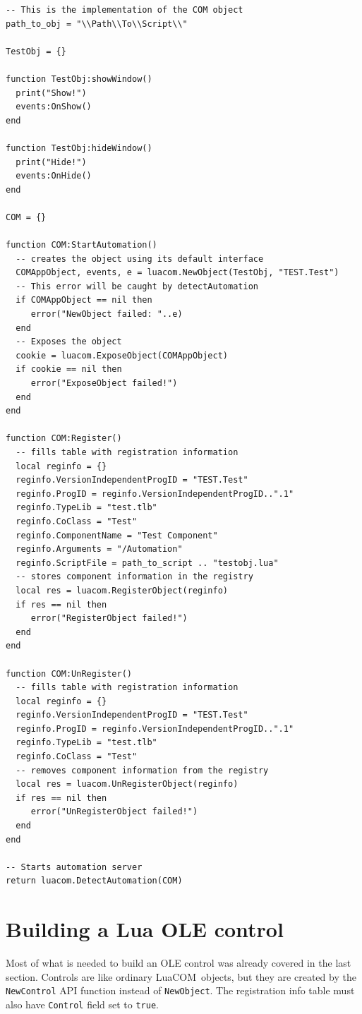 \documentclass[11pt,a4paper,english]{report}
\newcommand{\techname}[1]{\mbox{#1}}
\newcommand{\luacom}{\techname{LuaCOM}}
\begin{document}
\begin{verbatim}
-- This is the implementation of the COM object
path_to_obj = "\\Path\\To\\Script\\"

TestObj = {}

function TestObj:showWindow()
  print("Show!")
  events:OnShow()
end

function TestObj:hideWindow()
  print("Hide!")
  events:OnHide()
end

COM = {}

function COM:StartAutomation()
  -- creates the object using its default interface
  COMAppObject, events, e = luacom.NewObject(TestObj, "TEST.Test")
  -- This error will be caught by detectAutomation
  if COMAppObject == nil then
     error("NewObject failed: "..e)
  end
  -- Exposes the object
  cookie = luacom.ExposeObject(COMAppObject)
  if cookie == nil then
     error("ExposeObject failed!")
  end
end

function COM:Register()
  -- fills table with registration information
  local reginfo = {}
  reginfo.VersionIndependentProgID = "TEST.Test"
  reginfo.ProgID = reginfo.VersionIndependentProgID..".1"
  reginfo.TypeLib = "test.tlb"
  reginfo.CoClass = "Test"
  reginfo.ComponentName = "Test Component"
  reginfo.Arguments = "/Automation"
  reginfo.ScriptFile = path_to_script .. "testobj.lua"
  -- stores component information in the registry
  local res = luacom.RegisterObject(reginfo)
  if res == nil then
     error("RegisterObject failed!")
  end
end

function COM:UnRegister()
  -- fills table with registration information
  local reginfo = {}
  reginfo.VersionIndependentProgID = "TEST.Test"
  reginfo.ProgID = reginfo.VersionIndependentProgID..".1"
  reginfo.TypeLib = "test.tlb"
  reginfo.CoClass = "Test"
  -- removes component information from the registry
  local res = luacom.UnRegisterObject(reginfo)
  if res == nil then
     error("UnRegisterObject failed!")
  end
end

-- Starts automation server
return luacom.DetectAutomation(COM)
\end{verbatim}


\section{Building a Lua OLE control}

Most of what is needed to build an OLE control was already covered
in the last section. Controls are like ordinary \luacom\ objects,
but they are created by the \verb+NewControl+ API function instead
of \verb+NewObject+. The registration info table must also have
\verb+Control+ field set to \verb+true+.
\end{document}

